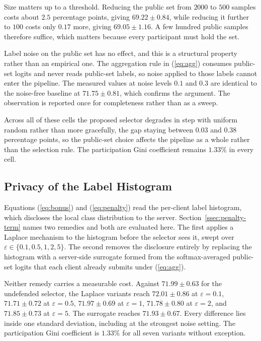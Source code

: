 \documentclass[journal]{IEEEtran}
\newcommand{\rev}[1]{#1}
\begin{document}
\rev{Size matters up to a threshold. Reducing the public set from $2000$ to $500$ samples costs about $2.5$ percentage points, giving $69.22 \pm 0.84$, while reducing it further to $100$ costs only $0.17$ more, giving $69.05 \pm 1.16$. A few hundred public samples therefore suffice, which matters because every participant must hold the set.}

\rev{Label noise on the public set has no effect, and this is a structural property rather than an empirical one. The aggregation rule in (\ref{eq:agg}) consumes public-set logits and never reads public-set labels, so noise applied to those labels cannot enter the pipeline. The measured values at noise levels $0.1$ and $0.3$ are identical to the noise-free baseline at $71.75 \pm 0.81$, which confirms the argument. The observation is reported once for completeness rather than as a sweep.}

\rev{Across all of these cells the proposed selector degrades in step with uniform random rather than more gracefully, the gap staying between $0.03$ and $0.38$ percentage points, so the public-set choice affects the pipeline as a whole rather than the selection rule. The participation Gini coefficient remains $1.33\%$ in every cell.}

\subsection{Privacy of the Label Histogram}
\label{ssec:exp-privacy}

\rev{Equations (\ref{eq:bonus}) and (\ref{eq:penalty}) read the per-client label histogram, which discloses the local class distribution to the server. Section~\ref{ssec:penalty-term} names two remedies and both are evaluated here. The first applies a Laplace mechanism to the histogram before the selector sees it, swept over $\varepsilon \in \{0.1, 0.5, 1, 2, 5\}$. The second removes the disclosure entirely by replacing the histogram with a server-side surrogate formed from the softmax-averaged public-set logits that each client already submits under (\ref{eq:agg}).}

\rev{Neither remedy carries a measurable cost. Against $71.99 \pm 0.63$ for the undefended selector, the Laplace variants reach $72.01 \pm 0.86$ at $\varepsilon = 0.1$, $71.71 \pm 0.72$ at $\varepsilon = 0.5$, $71.97 \pm 0.69$ at $\varepsilon = 1$, $71.78 \pm 0.80$ at $\varepsilon = 2$, and $71.85 \pm 0.73$ at $\varepsilon = 5$. The surrogate reaches $71.93 \pm 0.67$. Every difference lies inside one standard deviation, including at the strongest noise setting. The participation Gini coefficient is $1.33\%$ for all seven variants without exception.}
\end{document}
